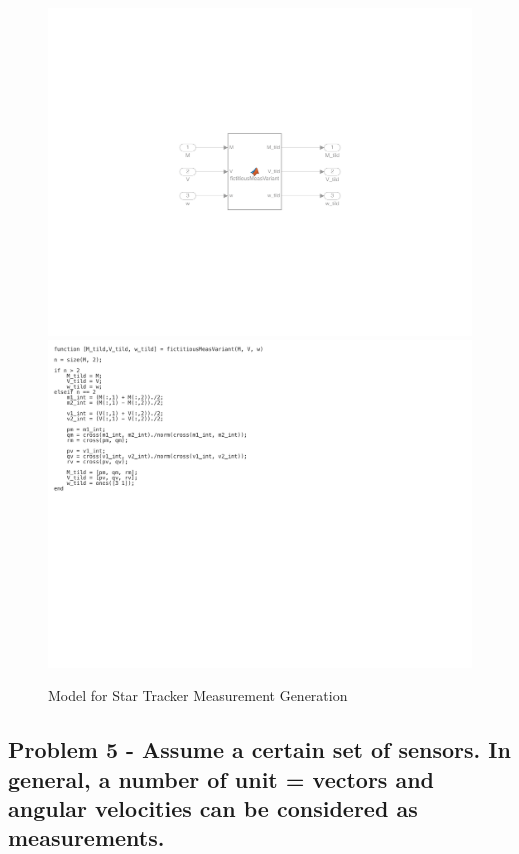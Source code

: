 \begin{figure}[H]
    \centering
    \captionsetup{ justification = centering }
    \includegraphics[trim={8cm 5cm 8cm 5cm},clip,width = 12cm]{Images/PS6/fict_meas.png}
    \includegraphics[trim={0cm 10cm 10cm 0cm},clip,width = 15cm]{Images/PS6/fict_meas_code.png}
    \caption{Model for Star Tracker Measurement Generation}
    \label{fig:fictitious_meas}
\end{figure}

\subsection{Problem 5 - Assume a certain set of sensors. In general, a number of unit = vectors and angular velocities can be considered as measurements.}

